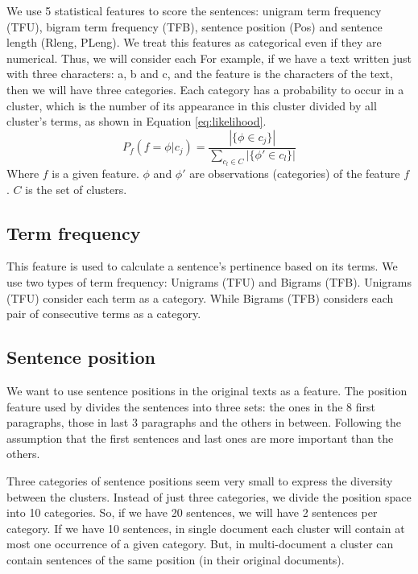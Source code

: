 We use 5 statistical features to score the sentences: unigram term frequency (TFU), bigram term frequency (TFB), sentence position (Pos) and sentence length (Rleng, PLeng).
We treat this features as categorical even if they are numerical. 
Thus, we will consider each 
For example, if we have a text written just with three characters: a, b and c, and the feature is the characters of the text, then we will have three categories.
Each category has a probability to occur in a cluster, which is the number of its appearance in this cluster divided by all cluster's terms, as shown in Equation \ref{eq:likelihood}. 
%
\begin{equation}
\label{eq:likelihood}
P_{f}(f = \phi | c_j) = \frac {|\{ \phi \in c_j \}|}{\sum_{c_l \in C}{| \{ \phi' \in c_l \} |}}
\end{equation}
Where $ f $ is a given feature.
$ \phi $ and $ \phi' $ are observations (categories) of the feature $ f $ .
$ C $ is the set of clusters.


\subsection{Term frequency}

This feature is used to calculate a sentence's pertinence based on its terms. 
We use two types of term frequency: Unigrams (TFU) and Bigrams (TFB). 
Unigrams (TFU) consider each term as a category.
While Bigrams (TFB) considers each pair of consecutive terms as a category.


\subsection{Sentence position}

We want to use sentence positions in the original texts as a feature. 
The position feature used by \citet{02-osborne} divides the sentences into three sets: the ones in the 8 first paragraphs, those in last 3 paragraphs and the others in between. 
Following the assumption that the first sentences and last ones are more important than the others. 

Three categories of sentence positions seem very small to express the diversity between the clusters.
Instead of just three categories, we divide the position space into 10 categories. 
So, if we have 20 sentences, we will have 2 sentences per category.
If we have 10 sentences, in single document each cluster will contain at most one occurrence of a given category.
But, in multi-document a cluster can contain sentences of the same position (in their original documents).


